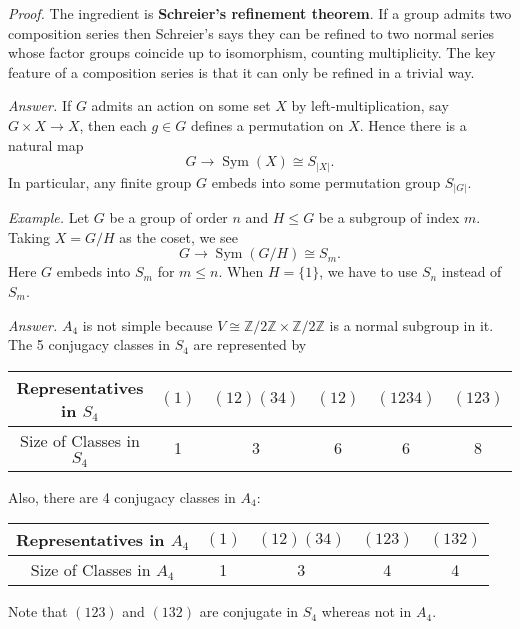 \documentclass{mathproblems}
\newcommand\Z{\mathbb{Z}}
\begin{document}
\begin{questions}
\textit{Proof.} The ingredient is {\color{violet} \textbf{Schreier’s refinement theorem}}. If a group admits two composition series then Schreier’s says they can be refined to two normal series whose factor groups coincide up to isomorphism, counting multiplicity. The key feature of a composition series is that it can only be refined in a trivial way.



\textit{Answer.} If $G$ admits an action on some set $X$ by left-multiplication, say $G\times X\to X$, then each $g\in G$ defines a permutation on $X$. Hence there is a natural map
$$
G\longrightarrow \operatorname{Sym}(X)\cong S_{|X|}.
$$
In particular, any finite group $G$ embeds into some permutation group $S_{|G|}$.

\textit{Example.} Let $G$ be a group of order $n$ and $H\leq G$ be a subgroup of index $m$. Taking $X=G/H$ as the coset, we see
$$
G\longrightarrow \operatorname{Sym}(G/H)\cong S_m.
$$
Here $G$ embeds into $S_m$ for $m\leq n$. When $H=\{1\}$, we have to use $S_n$ instead of $S_m$.


\textit{Answer.} $A_4$ is not simple because $V\cong \Z/2\Z\times \Z/2\Z$ is a normal subgroup in it. The 5 conjugacy classes in $S_4$ are represented by
\begin{center}
\begin{tabular}{c|ccccc}
Representatives in $S_4$ & $(1)$ & $(12)(34)$ & $(12)$ & $(1234)$ & $(123)$ \\
\hline Size of Classes in $S_4$ & 1 & 3 & 6 & 6 & 8
\end{tabular}
\end{center}
Also, there are 4 conjugacy classes in $A_4$:
\begin{center}
\begin{tabular}{c|cccc}
Representatives in $A_4$ & $(1)$ & $(12)(34)$ & $(123)$ & $(132)$ \\
\hline Size of Classes in $A_4$ & 1 & 3 & 4 & 4
\end{tabular}
\end{center}
Note that $(123)$ and $(132)$ are conjugate in $S_4$ whereas not in $A_4$.



\end{questions}
\end{document}
